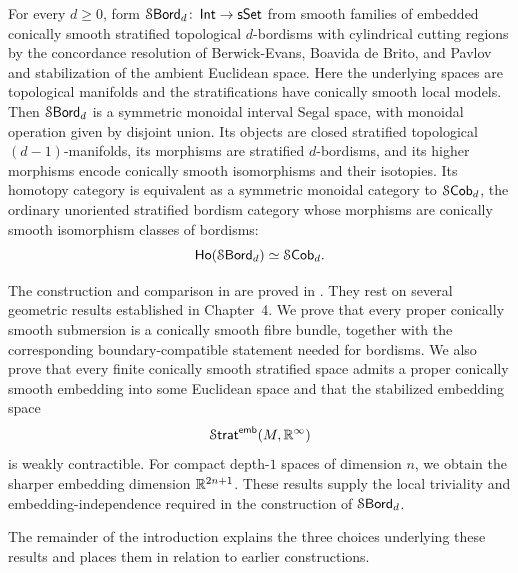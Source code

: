 \begin{samepage}
\begin{maintheorem}
\label{intro:: thm: stratified bordisms}
For every $d\geq 0$, form $\operatorname{\mathcal S\mathsf{Bord}}_d\colon\operatorname{\mathsf{Int}}\to\operatorname{\sf sSet}$ from smooth
families of embedded conically smooth stratified topological $d$-bordisms
with cylindrical cutting regions by the concordance resolution of
Berwick-Evans, Boavida de Brito, and Pavlov \cite{BBEP24} and
stabilization of the ambient Euclidean space. Here the underlying spaces
are topological manifolds and the stratifications have conically smooth
local models. Then $\operatorname{\mathcal S\mathsf{Bord}}_d$ is a symmetric monoidal interval Segal space,
with monoidal operation given by disjoint union. Its objects are closed
stratified topological $(d-1)$-manifolds, its morphisms are stratified
$d$-bordisms, and its higher morphisms encode conically smooth isomorphisms
and their isotopies. Its homotopy category is equivalent as a symmetric
monoidal category to $\mathcal S\mathsf{Cob}_d$, the ordinary unoriented stratified
bordism category whose morphisms are conically smooth isomorphism classes
of bordisms:
\[
    \operatorname{\sf Ho}(\operatorname{\mathcal S\mathsf{Bord}}_d)\simeq\mathcal S\mathsf{Cob}_d.
\]
\end{maintheorem}
\end{samepage}

The construction and comparison in 
are proved in .
They rest on several geometric results established in
Chapter~4. We prove that every proper conically smooth submersion is a
conically smooth fibre bundle, together with the corresponding
boundary-compatible statement needed for bordisms. We also prove that every
finite conically smooth stratified space admits a proper conically smooth
embedding into some Euclidean space and that the stabilized embedding space
\[
    \operatorname{\mathcal S\mathsf{trat}}^{\sf emb}(M,\mathbb R^{\operatorname{\infty}})
\]
is weakly contractible. For compact depth-$1$ spaces of dimension $n$, we
obtain the sharper embedding dimension $\mathbb R^{2n+1}$. These results supply the
local triviality and embedding-independence required in the construction of
$\operatorname{\mathcal S\mathsf{Bord}}_d$.

The remainder of the introduction explains the three choices underlying
these results and places them in relation to earlier constructions.

